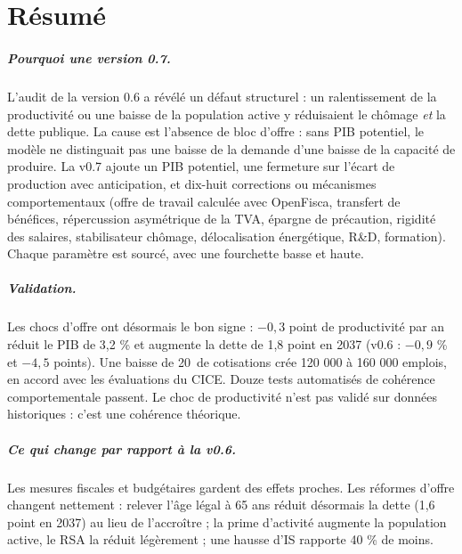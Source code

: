 \chapter*{Résumé}

\paragraph{Pourquoi une version 0.7.} L'audit de la version 0.6 a révélé un défaut structurel : un ralentissement de la
productivité ou une baisse de la population active y réduisaient le chômage \emph{et} la dette publique. La cause est
l'absence de bloc d'offre : sans PIB potentiel, le modèle ne distinguait pas une baisse de la demande d'une baisse de
la capacité de produire. La v0.7 ajoute un PIB potentiel, une fermeture sur l'écart de production avec anticipation, et
dix-huit corrections ou mécanismes comportementaux (offre de travail calculée avec OpenFisca, transfert de bénéfices,
répercussion asymétrique de la TVA, épargne de précaution, rigidité des salaires, stabilisateur chômage, délocalisation
énergétique, R\&D, formation). Chaque paramètre est sourcé, avec une fourchette basse et haute.

\paragraph{Validation.} Les chocs d'offre ont désormais le bon signe : $-0{,}3$ point de productivité par an réduit le
PIB de 3,2 \% et augmente la dette de 1,8 point en 2037 (v0.6 : $-0{,}9$ \% et $-4{,}5$ points). Une baisse de 20\md\ de
cotisations crée 120 000 à 160 000 emplois, en accord avec les évaluations du CICE. Douze tests automatisés de
cohérence comportementale passent. Le choc de productivité n'est pas validé sur données historiques : c'est une
cohérence théorique.

\paragraph{Ce qui change par rapport à la v0.6.} Les mesures fiscales et budgétaires gardent des effets proches. Les
réformes d'offre changent nettement : relever l'âge légal à 65 ans réduit désormais la dette (1,6 point en 2037) au lieu
de l'accroître ; la prime d'activité augmente la population active, le RSA la réduit légèrement ; une hausse d'IS
rapporte 40 \% de moins.

